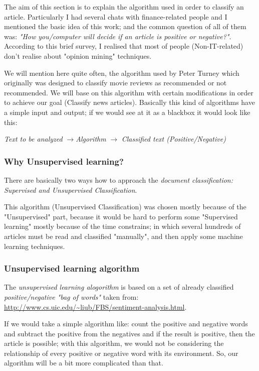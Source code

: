 The aim of this section is to explain the algorithm used in order to classify an article. Particularly I had several chats with finance-related people and I mentioned the basic idea of this work; and the common question of all of them was: \emph{"How you/computer will decide if an article is positive or negative?"}. According to this brief survey, I realised that most of people (Non-IT-related) don't realise about "opinion mining" techniques.

We will mention here quite often, the algorithm used by Peter Turney \cite{T2002} which originally was designed to classify movie reviews as recommended or not recommended. We will base on this algorithm with certain modifications in order to achieve our goal (Classify news articles). Basically this kind of algorithms have a simple input and output; if we would see at it as a blackbox it would look like this:


\emph{Text to be analyzed} $\rightarrow $\emph{Algorithm} $\rightarrow$ \emph{Classified text (Positive/Negative)}

\subsubsection{Why Unsupervised learning?}\label{whyUnsupervised}

There are basically two ways how to approach the \emph{document classification: Supervised and Unsupervised Classification}.

This algorithm (Unsupervised Classification) was chosen mostly because of the "Unsupervised" part, because it would be hard to perform some "Supervised learning" mostly because of the time constrains; in which several hundreds of articles must be read and classified "manually", and then apply some machine learning techniques.

\subsubsection{Unsupervised learning algorithm}\label{unsupervisedAlgoritm}

The \emph{unsupervised learning alogorithm} is based on a set of already classified \emph{positive/negative "bag of words"} taken from: \url{http://www.cs.uic.edu/~liub/FBS/sentiment-analysis.html}.

If we would take a simple algorithm like: count the positive and negative words and subtract the positive from the negatives and if the result is positive, then the article is possible; with this algorithm, we would not be considering the relationship of every positive or negative word with its environment. So, our algorithm will be a bit more complicated than that. 

